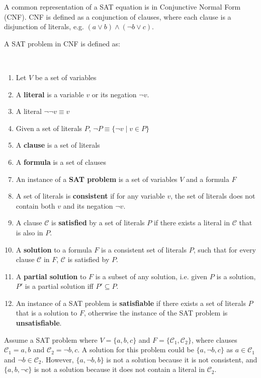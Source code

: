 A common representation of a SAT equation is in Conjunctive Normal Form (CNF).
CNF is defined as a conjunction of clauses, 
where each clause is a disjunction of literals, e.g. $(a \vee b) \wedge (\neg b \vee c)$.

A SAT problem in CNF is defined as:
\begin{defs}
\label{impl.defSAT}
{\ }
\begin{enumerate}
	\item Let $V$ be a set of variables
	\item A \textbf{literal} is a variable $v$ or its negation $\neg v$.
	\item A literal $\neg \neg v \equiv v$
	\item Given a set of literals $P$, $\neg P \equiv \{\neg v \mid v \in P\}$
	\item A \textbf{clause} is a set of literals 
	\item A \textbf{formula} is a set of clauses \label{impl.whatisaformula}
	\item An instance of a \textbf{SAT problem} is a set of variables $V$ and a formula $F$
	\item A set of literals is \textbf{consistent} if for any variable $v$, the set of literals does not contain both $v$ and its negation $\neg v$.
	\item A clause $\mathcal{C}$ is \textbf{satisfied} by a set of literals $P$ if there exists a literal in $\mathcal{C}$ that is also in $P$.
	\item A \textbf{solution} to a formula $F$ is a consistent set of literals $P$, such that for every clause $\mathcal{C}$ in $F$, $\mathcal{C}$ is satisfied by $P$.
	\item A \textbf{partial solution} to $F$ is a subset of any solution, i.e. given $P$ is a solution, $P'$ is a partial solution iff $P' \subseteq P$.
	\item An instance of a SAT problem is \textbf{satisfiable} if there exists a set of literals $P$ that is a solution to $F$, otherwise the instance of the SAT problem is \textbf{unsatisfiable}. 
\end{enumerate}
\end{defs}

Assume a SAT problem where $V = \{a,b,c\}$ and $F = \{\mathcal{C}_1,\mathcal{C}_2\}$, where clauses $\mathcal{C}_1 = {a,b}$ and $\mathcal{C}_2 = {\neg b, c}$.
A solution for this problem could be $\{a,\neg b,c\}$ as $a \in \mathcal{C}_1$ and $\neg b \in \mathcal{C}_2$.
However, $\{a, \neg b, b\}$ is not a solution because it is not consistent, and $\{a, b, \neg c\}$ is not a solution because it does not contain a literal in $\mathcal{C}_2$.  


